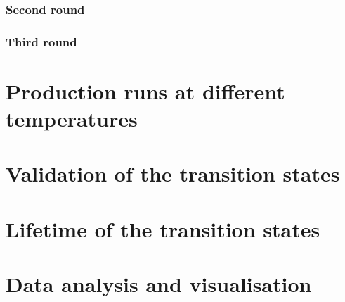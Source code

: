 \subsubsection{Second round}

\subsubsection{Third round}



\section{Production runs at different temperatures}


\section{Validation of the transition states}


\section{Lifetime of the transition states}


\section{Data analysis and visualisation}